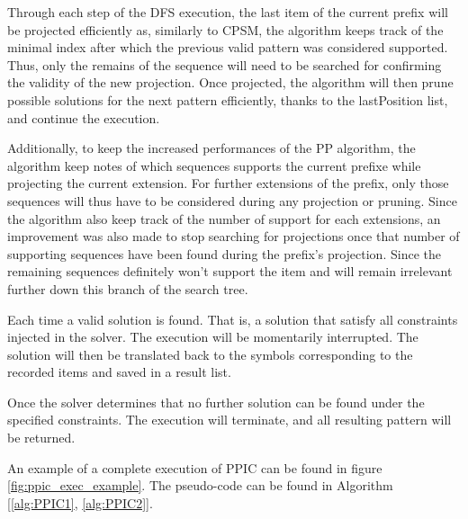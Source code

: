 \documentclass{eplmastersthesis}
\begin{document}
\begin{enumerate}
Through each step of the DFS execution, the last item of the current prefix will be projected efficiently as, similarly to CPSM, the algorithm keeps track of the minimal index after which the previous valid pattern was considered supported. Thus, only the remains of the sequence will need to be searched for confirming the validity of the new projection. Once projected, the algorithm will then prune possible solutions for the next pattern efficiently, thanks to the lastPosition list, and continue the execution. 

Additionally, to keep the increased performances of the PP algorithm, the algorithm keep notes of which sequences supports the current prefixe while projecting the current extension. For further extensions of the prefix, only those sequences will thus have to be considered during any projection or pruning. Since the algorithm also keep track of the number of support for each extensions, an improvement was also made to stop searching for projections once that number of supporting sequences have been found during the prefix's projection. Since the remaining sequences definitely won't support the item and will remain irrelevant further down this branch of the search tree. \newline

Each time a valid solution is found. That is, a solution that satisfy all constraints injected in the solver. The execution will be momentarily interrupted. The solution will then be translated back to the symbols corresponding to the recorded items and saved in a result list. \newline

Once the solver determines that no further solution can be found under the specified constraints. The execution will terminate, and all resulting pattern will be returned.
\end{enumerate}

An example of a complete execution of PPIC can be found in figure \ref{fig:ppic_exec_example}. The pseudo-code can be found in Algorithm [\ref{alg:PPIC1}, \ref{alg:PPIC2}]. \newline
\end{document}
